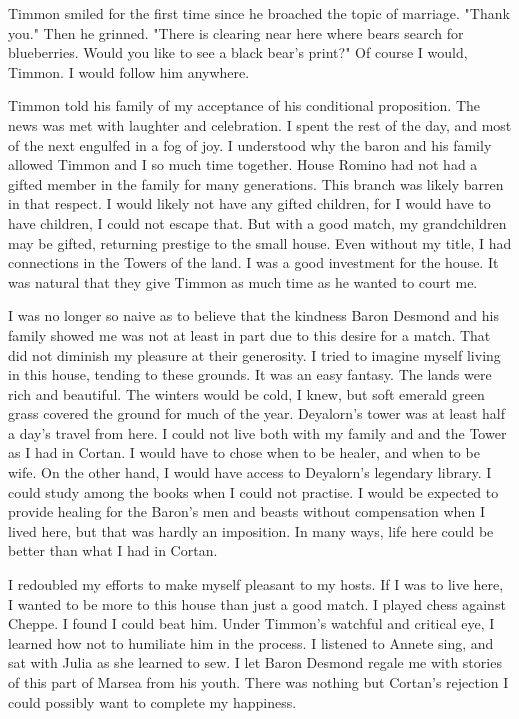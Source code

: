\documentclass{article}
\begin{document}
Timmon smiled for the first time since he broached the topic of marriage. "Thank you." Then he grinned. "There is clearing near here where bears search for blueberries. Would you like to see a black bear's print?" Of course I would, Timmon. I would follow him anywhere.

\vspace{.5cm}

Timmon told his family of my acceptance of his conditional proposition. The news was met with laughter and celebration. I spent the rest of the day, and most of the next engulfed in a fog of joy. I understood why the baron and his family allowed Timmon and I so much time together. House Romino had not had a gifted member in the family for many generations. This branch was likely barren in that respect. I would likely not have any gifted children, for I would have to have children, I could not escape that. But with a good match, my grandchildren may be gifted, returning prestige to the small house. Even without my title, I had connections in the Towers of the land. I was a good investment for the house. It was natural that they give Timmon as much time as he wanted to court me. 

I was no longer so naive as to believe that the kindness Baron Desmond and his family showed me was not at least in part due to this desire for a match. That did not diminish my pleasure at their generosity. I tried to imagine myself living in this house, tending to these grounds. It was an easy fantasy. The lands were rich and beautiful. The winters would be cold, I knew, but soft emerald green grass covered the ground for much of the year. Deyalorn's tower was at least half a day's travel from here. I could not live both with my family and and the Tower as I had in Cortan. I would have to chose when to be healer, and when to be wife. On the other hand, I would have access to Deyalorn's legendary library. I could study among the books when I could not practise. I would be expected to provide healing for the Baron's men and beasts without compensation when I lived here, but that was hardly an imposition. In many ways, life here could be better than what I had in Cortan. 

I redoubled my efforts to make myself pleasant to my hosts. If I was to live here, I wanted to be more to this house than just a good match. I played chess against Cheppe. I found I could beat him. Under Timmon's watchful and critical eye, I learned how not to humiliate him in the process. I listened to Annete sing, and sat with Julia as she learned to sew. I let Baron Desmond regale me with stories of this part of Marsea from his youth. There was nothing but Cortan's rejection I could possibly want to complete my happiness. 
\end{document}
